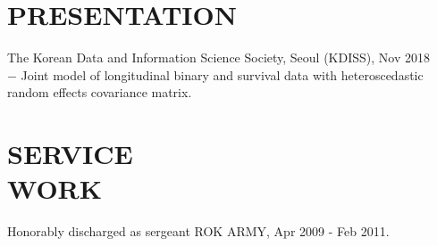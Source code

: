 \documentclass[margin]{res}
\begin{document}
\begin{resume}

\section{PRESENTATION}
\par
The Korean Data and Information Science Society, Seoul (KDISS), Nov 2018\\
\hspace*{3mm} $-$ Joint model of longitudinal binary and survival data with heteroscedastic \\ \hspace*{6mm}random effects covariance matrix.\\








\section{SERVICE \\ WORK}

Honorably discharged as sergeant ROK ARMY, Apr 2009 - Feb 2011.




\end{resume}
\end{document}
